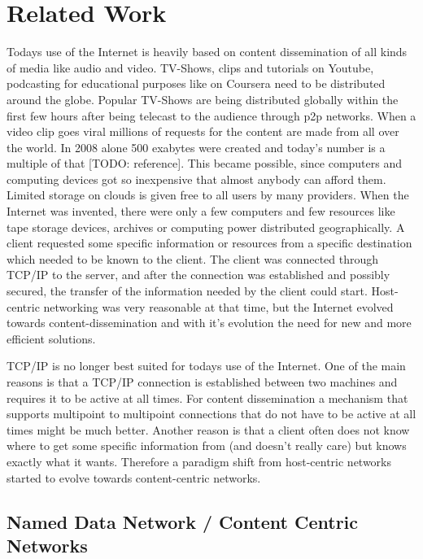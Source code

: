 \chapter{Related Work}

Todays use of the Internet is heavily based on content dissemination of all kinds of media like audio and video. TV-Shows, clips and tutorials on Youtube, podcasting for educational purposes like on Coursera need to be distributed around the globe. Popular TV-Shows are being distributed globally within the first few hours after being telecast to the audience through p2p networks. When a video clip goes viral millions of requests for the content are made from all over the world. In 2008 alone 500 exabytes were created and today's number is a multiple of that [TODO: reference]. This became possible, since computers and computing devices got so inexpensive that almost anybody can afford them. Limited storage on clouds is given free to all users by many providers. When the Internet was invented, there were only a few computers and few resources like tape storage devices, archives or computing power distributed geographically. A client requested some specific information or resources from a specific destination which needed to be known to the client. The client was connected through TCP/IP to the server, and after the connection was established and possibly secured, the transfer of the information needed by the client could start. Host-centric networking was very reasonable at that time, but the Internet evolved towards content-dissemination and with it's evolution the need for new and more efficient solutions.

\vspace{5mm} %

TCP/IP is no longer best suited for todays use of the Internet. One of the main reasons is that a TCP/IP connection is established between two machines and requires it to be active at all times. For content dissemination a mechanism that supports multipoint to multipoint connections that do not have to be active at all times might be much better. Another reason is that a client often does not know where to get some specific information from (and doesn't really care) but knows exactly what it wants. Therefore a paradigm shift from host-centric networks started to evolve towards content-centric networks.

\newpage

\section{Named Data Network / Content Centric Networks}

